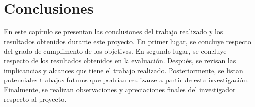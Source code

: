 \chapter{Conclusiones}
\label{chp:conclusiones}
En este capítulo se presentan las conclusiones del trabajo realizado y los resultados obtenidos durante este proyecto. En primer lugar, se concluye respecto del grado de cumplimento de los objetivos. En segundo lugar, se concluye respecto de los resultados obtenidos en la evaluación. Después, se revisan las implicancias y alcances que tiene el trabajo realizado. Posteriormente, se listan potenciales trabajos futuros que podrían realizarse a partir de esta investigación. Finalmente, se realizan observaciones y apreciaciones finales del investigador respecto al proyecto. 


%
%
%